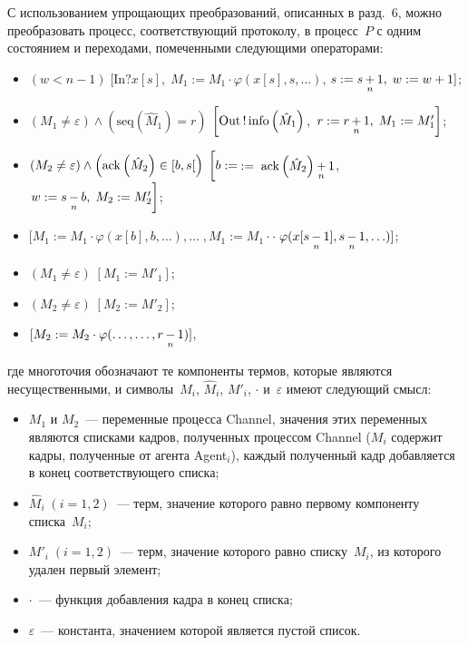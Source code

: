 \begin{multicols}{2}
С использованием упрощающих преобразований,
описанных в разд.~6, можно преобразовать
процесс, соответствующий протоколу,
в процесс~$P$ с одним состоянием и переходами, помеченными следующими операторами:
\begin{itemize}
\item $(w<n-1)\;[\mathrm{In}?x[s], \; M_1:=M_1 \cdot
\varphi(x[s], s, \ldots)$, $s:=s\mathop{+}\limits_{n}1, \;w:=w+1]$;

\columnbreak

\item $(M_1\neq \varepsilon)\wedge
\left(\mathrm{seq}\left(\hat M_1\right)=r\right)$ $\left[
\vphantom{\modp{n}}
\mathrm{Out}\,!\,\mathrm{info}\left(
\hat M_1\right)\right.$,\linebreak
$\left. r:=r\mathop{+}\limits_{n}1,\; M_1:=M_1'\right]$;
\item $(M_2\neq \varepsilon)\wedge\left(\mathrm{ack}\left (\hat M_2\right)
\in [b, s[ \right)\;\left[
\vphantom{\left(\hat M_2\right)\modp{n}1}
b:=\right.$\linebreak $:=\;\mathrm{ack} \left(\hat M_2\right)\mathop{+}\limits_{n}1$,
$\left.w:=s\mathop{-}\limits_{n}b,\; M_2:=M_2'\right]$;
\item $[M_1:=
   M_1\cdot \varphi(x[b], b,\ldots)
   ,\ldots\; ,
   M_1:=M_1\cdot$\linebreak $\cdot\;\varphi(x[s\mathop{-}\limits_{n}1], s\mathop{-}\limits_{n}1,
   \ldots)]$;
\item $(M_1\neq \varepsilon)\;[M_1:=M'_1]$;
\item $(M_2\neq \varepsilon)\;[M_2:=M'_2]$;
\item $[M_2:=  M_2\cdot \varphi(\ldots, \ldots, r\mathop{-}\limits_{n}1)]$,
\end{itemize}
где многоточия обозначают те компоненты термов,  которые являются
несущественными, и символы~$M_i$, $\hat M_i$, $M'_i$, $\cdot$ и~$\varepsilon$
имеют следующий смысл:
\begin{itemize}
\item $M_1$ и $M_2$~--- переменные процесса Channel,  значения этих переменных
являются списками кад\-ров, полученных процессом Channel
($M_i$ содержит кад\-ры, полученные от агента Agent$_i$),
каждый полученный кадр добавляется в конец соответствующего списка;
\item $\hat M_i\;(i=1,2)$~--- терм, значение которого равно первому
компоненту списка~$M_i$;
\item $M'_i\;(i=1,2)$~--- терм, значение которого равно
списку~$M_i$, из которого удален первый элемент;
\item $\cdot$~--- функция добавления кад\-ра в конец списка;
\item $\varepsilon$~--- константа, значением которой является пус\-той список.
\end{itemize}


\end{multicols}

